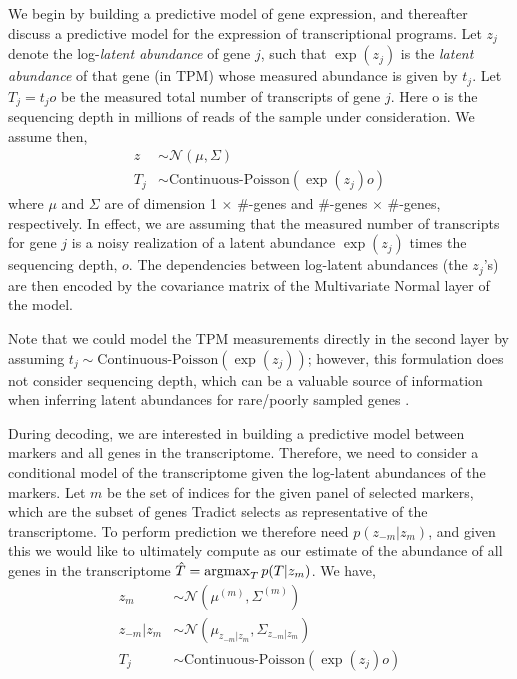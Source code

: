 \documentclass[10pt]{article}
\newcommand{\argmax}{\operatornamewithlimits{argmax}}
\begin{document}
We begin by building a predictive model of gene expression, and thereafter discuss a predictive model for the expression of transcriptional programs. Let $z_j$ denote the log-\emph{latent abundance} of gene $j$, such that $\exp(z_j)$ is the \emph{latent abundance} of that gene (in TPM) whose measured abundance is given by $t_j$. Let $T_j = t_jo$ be the measured total number of transcripts of gene $j$. Here o is the sequencing depth in millions of reads of the sample under consideration. We assume then, 
\begin{align*}
z & \sim \mathcal{N}\left(\mu, \Sigma\right) \\
T_j & \sim \textrm{Continuous-Poisson}(\exp(z_j)o)
\end{align*}
where $\mu$ and $\Sigma$ are of dimension 1 $\times$ $\#$-genes and $\#$-genes $\times$ $\#$-genes, respectively. In effect, we are assuming that the measured number of transcripts for gene $j$ is a noisy realization of a latent abundance $\exp(z_j)$ times the sequencing depth, $o$. The dependencies between log-latent abundances (the $z_j$'s) are then encoded by the covariance matrix of the Multivariate Normal layer of the model. 


Note that we could model the TPM measurements directly in the second layer by assuming $t_j \sim \textrm{Continuous-Poisson}(\exp(z_j))$; however, this formulation does not consider sequencing depth, which can be a valuable source of information when inferring latent abundances for rare/poorly sampled genes \cite{Biswas2016a}. 

During decoding, we are interested in building a predictive model between markers and all genes in the transcriptome. Therefore, we need to consider a conditional model of the transcriptome given the log-latent abundances of the markers. Let $m$ be the set of indices for the given panel of selected markers, which are the subset of genes Tradict selects as representative of the transcriptome. To perform prediction we therefore need $p(z_{-m} | z_m)$, and given this we would like to ultimately compute as our estimate of the abundance of all genes in the transcriptome $\hat{T} = \argmax_T p(T | z_m)$.  We have, 
\begin{align*}
z_m & \sim \mathcal{N}(\mu^{(m)}, \Sigma^{(m)}) \\
z_{-m}|z_m & \sim \mathcal{N}(\mu_{z_{-m}|z_m}, \Sigma_{z_{-m}|z_m}) \\
T_j & \sim \textrm{Continuous-Poisson}(\exp(z_j)o)
\end{align*}
\end{document}
